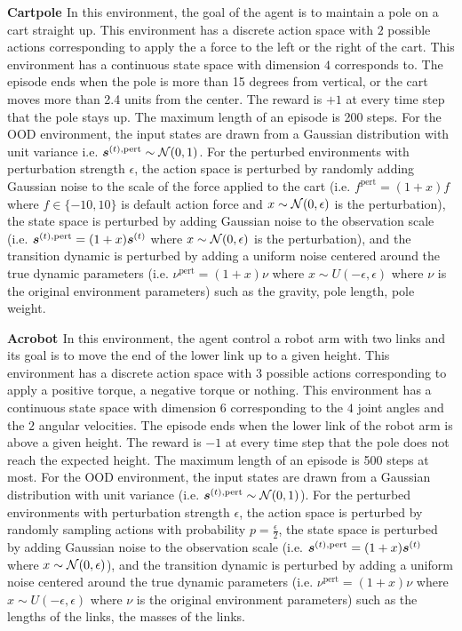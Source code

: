 \textbf{Cartpole \citep{cartpole}} In this environment, the goal of the agent is to maintain a pole on a cart straight up. This environment has a discrete action space with $2$ possible actions corresponding to apply the a force to the left or the right of the cart. This environment has a continuous state space with dimension $4$ corresponds to. The episode ends when the pole is more than 15 degrees from vertical, or the cart moves more than 2.4 units from the center. The reward is $+1$ at every time step that the pole stays up. The maximum length of an episode is 200 steps. For the OOD environment, the input states are drawn from a Gaussian distribution with unit variance i.e. $\bm{s}^{(t), \text{pert}} \sim \operatorname{\mathcal{N}}(0, 1)$. For the perturbed environments with perturbation strength $\epsilon$, the action space is perturbed by randomly adding Gaussian noise to the scale of the force applied to the cart (i.e. $f^{\text{pert}} = (1 + x)f$ where $f \in \{-10, 10\}$ is default action force and $x \sim \operatorname{\mathcal{N}}(0, \epsilon)$ is the perturbation), the state space is perturbed by adding Gaussian noise to the observation scale (i.e. $\bm{s}^{(t), \text{pert}} = (1 + x)\bm{s}^{(t)}$ where $x \sim \operatorname{\mathcal{N}}(0, \epsilon)$ is the perturbation), and the transition dynamic is perturbed by adding a uniform noise centered around the true dynamic parameters (i.e. $\nu^{\text{pert}} = (1 + x) \nu$ where $x \sim U(-\epsilon, \epsilon)$ where $\nu$ is the original environment parameters) such as the gravity, pole length, pole weight.

\textbf{Acrobot \citep{acrobot1, acrobot2}} In this environment, the agent control a robot arm with two links and its goal is to move the end of the lower link up to a given height. This environment has a discrete action space with $3$ possible actions corresponding to apply a positive torque, a negative torque or nothing. This environment has a continuous state space with dimension $6$ corresponding to the $4$ joint angles and the $2$ angular velocities. The episode ends when the lower link of the robot arm is above a given height. The reward is $-1$ at every time step that the pole does not reach the expected height. The maximum length of an episode is 500 steps at most. For the OOD environment, the input states are drawn from a Gaussian distribution with unit variance (i.e. $\bm{s}^{(t), \text{pert}} \sim \operatorname{\mathcal{N}}(0, 1)$). For the perturbed environments with perturbation strength $\epsilon$, the action space is perturbed by randomly sampling actions with probability $p=\frac{\epsilon}{2}$, the state space is perturbed by adding Gaussian noise to the observation scale (i.e. $\bm{s}^{(t), \text{pert}} = (1 + x)\bm{s}^{(t)}$ where $x \sim \operatorname{\mathcal{N}}(0, \epsilon)$), and the transition dynamic is perturbed by adding a uniform noise centered around the true dynamic parameters (i.e. $\nu^{\text{pert}} = (1 + x) \nu$ where $x \sim U(-\epsilon, \epsilon)$ where $\nu$ is the original environment parameters) such as the lengths of the links, the masses of the links.

